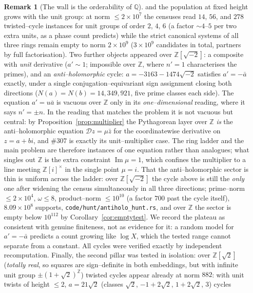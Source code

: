 \documentclass[11pt]{article}
\theoremstyle{definition}
\newtheorem{remark}[theorem]{Remark}
\begin{document}
\begin{remark}[The wall is the orderability of $\mathbb{Q}$]
and the population at fixed height grows with the unit group: at norm $\le2\times10^7$ the censuses
read $14$, $56$, and $278$ twisted--cycle instances for unit groups of order $2$, $4$, $6$ (a factor
${\sim}4$--$5$ per two extra units, as a phase count predicts) while the strict canonical systems of
all three rings remain empty to norm $2\times10^9$ ($3\times10^9$ candidates in total, partners by full
factorisation). Two further objects appeared over $\mathbb{Z}[\sqrt{-2}]$: a composite with \emph{unit}
derivative ($a'\sim1$; impossible over $\mathbb{Z}$, where $n'=1$ characterises the primes), and an
\emph{anti--holomorphic} cycle: $a=-3163-1474\sqrt{-2}$ satisfies $a'=-\bar a$ exactly, under a single
conjugation--equivariant sign assignment closing both directions ($N(a)=N(b)=14{,}349{,}921$, five prime
classes each side). The equation $a'=u\bar a$ is vacuous over $\mathbb{Z}$ only in its
\emph{one--dimensional} reading, where it says $n'=\pm n$. In the reading that matches the problem it is
not vacuous but central: by Proposition~\ref{prop:multiplier} the Pythagorean layer over $\mathbb{Z}$
\emph{is} the anti--holomorphic equation $\mathcal{D}z=\mu\bar z$ for the coordinatewise derivative on
$z=a+bi$, and \#307 is exactly its unit--multiplier case. The ring ladder and the main problem are
therefore instances of one equation rather than analogues; what singles out $\mathbb{Z}$ is the extra
constraint $\operatorname{Im}\mu=1$, which confines the multiplier to a line meeting
$\mathbb{Z}[i]^{\times}$ in the single point $\mu=i$. That the anti--holomorphic sector is thin is
uniform across the ladder: over $\mathbb{Z}[\sqrt{-2}]$ the cycle above is still the \emph{only} one
after widening the census simultaneously in all three directions; prime--norm $\le2\times10^4$,
$\omega\le8$, product--norm $\le10^{10}$ (a factor $700$ past the cycle itself), $8.09\times10^8$
supports, \texttt{code/hunt/antiholo\_hunt.rs}, and over
$\mathbb{Z}$ the sector is empty below $10^{112}$ by Corollary~\ref{cor:emptytest}. We record the
plateau as consistent with genuine finiteness, not as evidence for it: a random model for
$a'=-\bar a$ predicts a count growing like $\log X$, which the tested range cannot separate from a
constant. All cycles were verified exactly by independent recomputation. Finally, the second pillar was tested in isolation: over
$\mathbb{Z}[\sqrt2]$ (\emph{totally real}, so squares are sign--definite in both embeddings, but with
infinite unit group $\pm(1+\sqrt2)^{\mathbb{Z}}$) twisted cycles appear already at norm $882$: with
unit twists of height $\le2$, $a=21\sqrt2$ (classes $\sqrt2$, $-1+2\sqrt2$, $1+2\sqrt2$, $3$) cycles

\end{remark}
\end{document}

